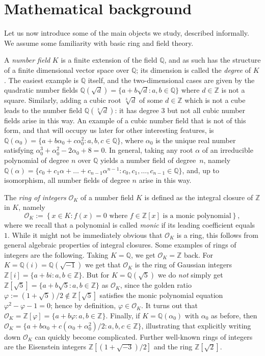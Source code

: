 \documentclass[sn-mathphys]{sn-jnl}%
\newcommand*{\OK}[1][K]{\mathcal{O}_{#1}}
\newcommand{\QQ}{\mathbb{Q}}
\renewcommand{\Z}{\mathbb{Z}}
\begin{document}
\section{Mathematical background}\label{sec math background}

Let us now introduce some of the main objects we study, described informally. We assume some familiarity with basic ring and field theory.

A \emph{number field} $K$ is a finite extension of the field $\QQ$, and as such has the structure of a finite dimensional vector space over $\QQ$; its dimension is called the \emph{degree} of $K$.
The easiest example is $\QQ$ itself, and the two-dimensional cases are given by the quadratic number fields
$\QQ(\sqrt{d})=\{a+b\sqrt{d} : a,b \in \QQ\}$
where $d \in \Z$ is not a square. Similarly, adding a cubic root $\sqrt[3]{d}$ of some $d\in\Z$ which is not a cube leads to the number field $\QQ(\sqrt[3]{d})$: it has degree $3$ but not all cubic number fields arise in this way.
An example of a cubic number field that is not of this form, and that will occupy us later for other interesting features, is $\QQ(\alpha_0)=\{a+b\alpha_0+c \alpha_0^2: a,b,c \in \QQ\}$, where $\alpha_0$ is the unique real number satisfying $\alpha_0^3 + \alpha_0^2 - 2\alpha_0 + 8=0$.
In general, taking any root $\alpha$ of an irreducible polynomial of degree $n$ over $\QQ$ yields a number field of degree~$n$, namely
$\QQ(\alpha)=\{c_0+c_1\alpha+\ldots+c_{n-1} \alpha^{n-1} : c_0,c_1,\ldots,c_{n-1} \in \QQ \}$,
and, up to isomorphism, all number fields of degree $n$ arise in this way.

The \emph{ring of integers} $\OK$ of a number field $K$ is defined as the integral closure of $\Z$ in $K$, namely
\[
  \OK := \left\{x \in K : f(x)=0 \text{ where $f \in \Z[x]$ is a monic polynomial}\right\},\]
where we recall that a polynomial is called \emph{monic} if its leading coefficient equals~$1$.
While it might not be immediately obvious that $\OK$ is a ring, this follows from general algebraic properties of integral closures.
Some examples of rings of integers are the following. Taking $K=\QQ$, we get $\OK=\Z$ back.
For $K=\QQ(i)=\QQ(\sqrt{-1})$ we get that $\OK$ is the ring of Gaussian integers $\Z[i]=\{a+bi : a,b \in \Z\}$.
But for $K=\QQ(\sqrt{5})$ we do \emph{not} simply get $\Z[\sqrt{5}]=\{a+b\sqrt{5} : a,b \in \Z\}$ as $\OK$, since the golden ratio $\varphi:=(1+\sqrt{5})/2\not\in \Z[\sqrt{5}]$ satisfies the monic polynomial equation $\varphi^2-\varphi-1=0$; hence by definition, $\varphi \in \OK$.
It turns out that $\OK=\Z[\varphi]=\{a+b\varphi : a,b \in \Z\}$.
Finally, if $K=\QQ(\alpha_0)$ with $\alpha_0$ as before, then $\OK=\{a+b \alpha_0+c (\alpha_0+\alpha_0^2)/2 : a,b,c \in \Z\}$, illustrating that explicitly writing down $\OK$ can quickly become complicated.
Further well-known rings of integers are
the Eisenstein integers $\Z[(1+\sqrt{-3})/2]$ and the ring $\Z[\sqrt{2}]$.
\end{document}
